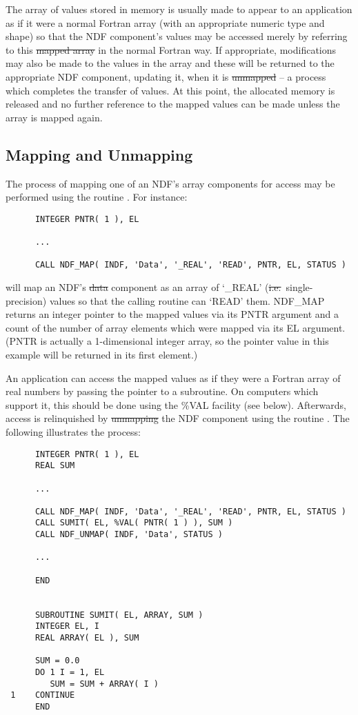The array of values stored in memory is usually made to appear to an
application as if it were a normal Fortran array (with an appropriate
numeric type and shape) so that the NDF component's values may be accessed
merely by referring to this \st{mapped array\/} in the normal Fortran way. If
appropriate, modifications may also be made to the values in the array and
these will be returned to the appropriate NDF component, updating it, when
it is \st{unmapped\/} -- a process which completes the transfer of values. At
this point, the allocated memory is released and no further reference to
the mapped values can be made unless the array is mapped again. 

\subsection{\label{ss:map}Mapping and Unmapping}

The process of mapping one of an NDF's array components for access may be
performed using the routine . 
For instance:

\small
\begin{verbatim}
      INTEGER PNTR( 1 ), EL

      ...

      CALL NDF_MAP( INDF, 'Data', '_REAL', 'READ', PNTR, EL, STATUS )
\end{verbatim}
\normalsize

will map an NDF's \st{data\/} component as an array of `\_REAL' (\st{i.e.}\ 
single-precision) values so that the calling routine can `READ' them. 
NDF\_MAP returns an integer pointer to the mapped values via its PNTR
argument and a count of the number of array elements which were mapped via
its EL argument. 
(PNTR is actually a 1-dimensional integer array, so the pointer value in
this example will be returned in its first element.) 

An application can access the mapped values as if they were a Fortran
array of real numbers by passing the pointer to a subroutine.  On
computers which support it, this should be done using the \%VAL
facility (see below).  Afterwards, access is relinquished by
\st{unmapping\/} the NDF component using the routine
.  The 
following illustrates the process:

\small
\begin{verbatim}
      INTEGER PNTR( 1 ), EL
      REAL SUM

      ...

      CALL NDF_MAP( INDF, 'Data', '_REAL', 'READ', PNTR, EL, STATUS )
      CALL SUMIT( EL, %VAL( PNTR( 1 ) ), SUM )
      CALL NDF_UNMAP( INDF, 'Data', STATUS )

      ...

      END


      SUBROUTINE SUMIT( EL, ARRAY, SUM )
      INTEGER EL, I
      REAL ARRAY( EL ), SUM

      SUM = 0.0
      DO 1 I = 1, EL
         SUM = SUM + ARRAY( I )
 1    CONTINUE
      END
\end{verbatim}
\normalsize

